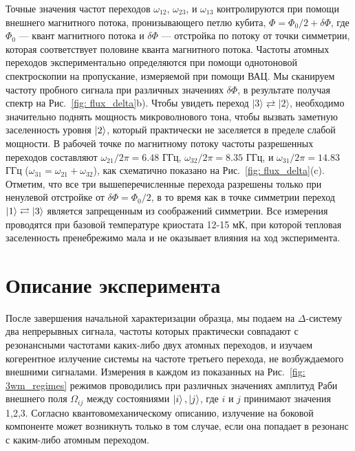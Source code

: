 Точные значения частот переходов $\omega_{12}$, $\omega_{23}$, и $\omega_{13}$ контролируются при помощи внешнего магнитного потока, пронизывающего петлю кубита, $\Phi=\Phi_{0}/2+\delta\Phi$, где $\Phi_{0}$ --- квант магнитного потока и $\delta\Phi$ --- отстройка по потоку от точки симметрии, которая соответствует половине кванта магнитного потока. Частоты атомных переходов экспериментально определяются при помощи однотоновой спектроскопии на пропускание, измеряемой при помощи ВАЦ. Мы сканируем частоту пробного сигнала при различных значениях $\delta\Phi$, в результате получая спектр на Рис.~\ref{fig: flux_delta}b). Чтобы увидеть переход $|3\rangle \rightleftarrows |2\rangle$, необходимо значительно поднять мощность микроволнового тона, чтобы вызвать заметную заселенность уровня $\ket{2}$, который практически не заселяется в пределе слабой мощности. 
В рабочей точке по магнитному потоку частоты разрешенных переходов составляют $\omega_{21}/2\pi = 6.48$ ГГц, $\omega_{32}/2\pi = 8.35$ ГГц, и $\omega_{31}/2\pi = 14.83$ ГГц ($\omega_{31} = \omega_{21}+\omega_{32}$),  как схематично показано на Рис.~\ref{fig: flux_delta}(c). Отметим, что все три вышеперечисленные перехода разрешены только при ненулевой отстройке от $\delta\Phi = \Phi_0/2$, в то время как в точке симметрии переход $\ket{1}\rightleftarrows\ket{3}$ является запрещенным из соображений симметрии. Все измерения проводятся при базовой температуре криостата 12-15 мК, при которой тепловая заселенность пренебрежимо мала и не оказывает влияния на ход эксперимента.

\section{Описание эксперимента}
После завершения начальной характеризации образца, мы подаем на $\Delta$-систему два непрерывных сигнала, частоты которых практически совпадают с резонансными частотами каких-либо двух атомных переходов, и изучаем когерентное излучение системы на частоте третьего перехода, не возбуждаемого внешними сигналами. 
Измерения в каждом из показанных на Рис.~\ref{fig: 3wm_regimes} режимов проводились при различных значениях амплитуд Раби внешнего поля $\Omega_{ij}$ между состояниями $\ket{i}, \ket{j}$, где $i$ и $j$ принимают значения 1,2,3. Согласно квантовомеханическому описанию, излучение на боковой компоненте может возникнуть только в том случае, если она попадает в резонанс с каким-либо атомным переходом.

